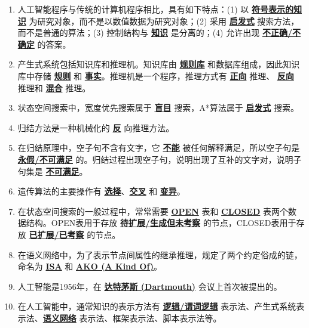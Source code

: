 \documentclass[12pt,a4paper,openany]{ctexbook}
\begin{document}
\begin{enumerate}[leftmargin=2em,itemsep=1em]
\item 人工智能程序与传统的计算机程序相比，具有如下特点：(1) 以 \underline{\textbf{符号表示的知识}} 为研究对象，而不是以数值数据为研究对象；(2) 采用 \underline{\textbf{启发式}} 搜索方法，而不是普通的算法；(3) 控制结构与 \underline{\textbf{知识}} 是分离的；(4) 允许出现 \underline{\textbf{不正确/不确定}} 的答案。

\item 产生式系统包括知识库和推理机。知识库由 \underline{\textbf{规则库}} 和数据库组成，因此知识库中存储 \underline{\textbf{规则}} 和 \underline{\textbf{事实}}。推理机是一个程序，推理方式有 \underline{\textbf{正向}} 推理、 \underline{\textbf{反向}} 推理和 \underline{\textbf{混合}} 推理。

\item 状态空间搜索中，宽度优先搜索属于 \underline{\textbf{盲目}} 搜索，A*算法属于 \underline{\textbf{启发式}} 搜索。

\item 归结方法是一种机械化的 \underline{\textbf{反}} 向推理方法。

\item 在归结原理中，空子句不含有文字，它 \underline{\textbf{不能}} 被任何解释满足，所以空子句是 \underline{\textbf{永假/不可满足}} 的。归结过程出现空子句，说明出现了互补的文字对，说明子句集是 \underline{\textbf{不可满足}}。

\item 遗传算法的主要操作有 \underline{\textbf{选择}}、\underline{\textbf{交叉}} 和 \underline{\textbf{变异}}。

\item 在状态空间搜索的一般过程中，常常需要 \underline{\textbf{OPEN}} 表和 \underline{\textbf{CLOSED}} 表两个数据结构。OPEN表用于存放 \underline{\textbf{待扩展/生成但未考察}} 的节点，CLOSED表用于存放 \underline{\textbf{已扩展/已考察}} 的节点。

\item 在语义网络中，为了表示节点间属性的继承推理，规定了两个约定俗成的链，命名为 \underline{\textbf{ISA}} 和 \underline{\textbf{AKO (A Kind Of)}}。

\item 人工智能是1956年，在 \underline{\textbf{达特茅斯 (Dartmouth)}} 会议上首次被提出的。

\item 在人工智能中，通常知识的表示方法有 \underline{\textbf{逻辑/谓词逻辑}} 表示法、产生式系统表示法、\underline{\textbf{语义网络}} 表示法、框架表示法、脚本表示法等。


\end{enumerate}
\end{document}
